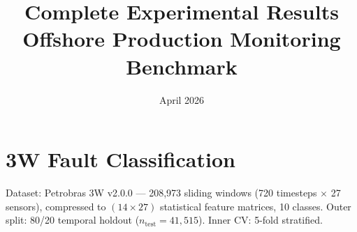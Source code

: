\documentclass[11pt]{article}
\title{Complete Experimental Results\\[4pt]
\large Offshore Production Monitoring Benchmark}
\author{}
\date{April 2026}
\begin{document}
\maketitle
\tableofcontents
\newpage

\section{3W Fault Classification}

Dataset: Petrobras 3W v2.0.0 — 208,973 sliding windows (720 timesteps $\times$ 27 sensors),
compressed to $(14 \times 27)$ statistical feature matrices, 10 classes.
Outer split: 80/20 temporal holdout ($n_\text{test} = 41{,}515$).
Inner CV: 5-fold stratified.
\end{document}
